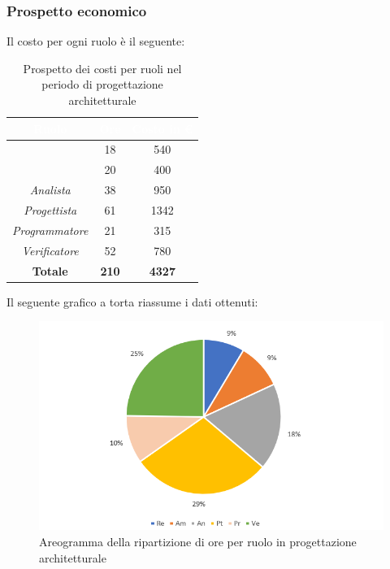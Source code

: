 \subsubsection{Prospetto economico}
Il costo per ogni ruolo è il seguente:
\begin{table}[H]
	\begin{center}
		\begin{tabular}{ |c c c| }
		\rowcolor{darkblue} 
		\textcolor{white}{\textbf{Ruolo}} & \textcolor{white}{\textbf{Ore}} & \textcolor{white}{\textbf{Costo in €}}\\ \hline
	{\Responsabile} 			& 18 & 540 \\ \hline
	{\Amministratore} 			& 20 & 400 \\ \hline
	\textit{Analista} 			& 38 & 950 \\ \hline
	\textit{Progettista} 		& 61 & 1342\\ \hline
	\textit{Programmatore}  	& 21 & 315 \\ \hline
	\textit{Verificatore} 		& 52 & 780 \\ \hline
	\textbf{Totale} & \textbf{210} & \textbf{4327} \\ \hline
	\end{tabular}
	\caption{Prospetto dei costi per ruoli nel periodo di progettazione architetturale}
	\end{center}
\end{table}
Il seguente grafico a torta riassume i dati ottenuti:
\begin{figure}[H]
    \centering
    \includegraphics[scale = 0.75]{Immagini/ArchitetturaTorta.png}
    \caption{Areogramma della ripartizione di ore per ruolo in progettazione architetturale}
    \label{fig:Areogramma ripartizione ore, periodo di Progettazione Architetturale}
\end{figure}

